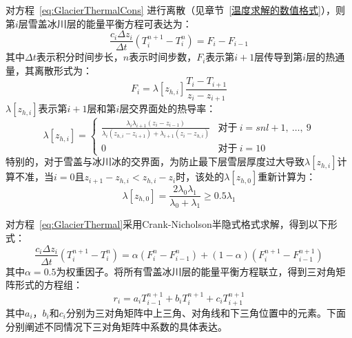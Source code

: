 对方程~\eqref{eq:GlacierThermalCons} 进行离散（见章节~\ref{温度求解的数值格式}），则第$i$层雪盖冰川层的能量平衡方程可表达为：
\begin{equation}\label{eq:GlacierThermal}
    \frac{c_i \Delta z_i}{\Delta t} \left(T^{n+1}_i - T^n_i\right) = F_i - F_{i-1}
\end{equation}
其中$\Delta t$表示积分时间步长，$n$表示时间步数，$F_i$表示第$i+1$层传导到第$i$层的热通量，其离散形式为：
\begin{equation}
    F_i = \lambda \left[z_{h,i}\right] \frac{T_i-T_{i+1}}{z_i-z_{i+1}}
\end{equation}
$\lambda\left[z_{h,i}\right]$表示第$i+1$层和第$i$层交界面处的热导率：
\begin{equation}
    \lambda \left[z_{h,i}\right] = \begin{cases}
        \frac{\lambda_i\lambda_{i+1}\left(z_i-z_{i-1}\right)}{\lambda_i\left(z_{h,i}-z_{i+1}\right)+\lambda_{i+1}\left(z_i-z_{h,i}\right)}  &\text{对于}\ i=snl+1,\ \ldots,\ 9 \\
        0 &\text{对于}\ i=10
    \end{cases}
\end{equation}
特别的，对于雪盖与冰川冰的交界面，为防止最下层雪层厚度过大导致$\lambda\left[z_{h,i}\right]$计算不准，当$i=0$且$z_{i+1}-z_{h,i}<z_{h,i}-z_i$时，该处的$\lambda\left[z_{h,0}\right]$重新计算为：
\begin{equation}
    \lambda\left[z_{h,0}\right]=\frac{2\lambda_0\lambda_1}{\lambda_0+\lambda_1} \geqslant 0.5\lambda_1
\end{equation}

对方程~\eqref{eq:GlacierThermal}采用Crank-Nicholson半隐式格式求解，得到以下形式：
\begin{equation}
    \frac{c_i\Delta z_i}{\Delta t}\left(T^{n+1}_i - T^n_i\right)=\alpha \left(F^n_i - F^n_{i-1}\right) + \left(1-\alpha \right) \left(F^{n+1}_i - F^{n+1}_{i-1}\right)
\end{equation}
其中$\alpha = 0.5$为权重因子。将所有雪盖冰川层的能量平衡方程联立，得到三对角矩阵形式的方程组：
\begin{equation}
    r_i = a_i T^{n+1}_{i-1} + b_i T^{n+1}_i + c_i T^{n+1}_{i+1}
\end{equation}
其中$a_i$，$b_i$和$c_i$分别为三对角矩阵中上三角、对角线和下三角位置中的元素。下面分别阐述不同情况下三对角矩阵中系数的具体表达。

